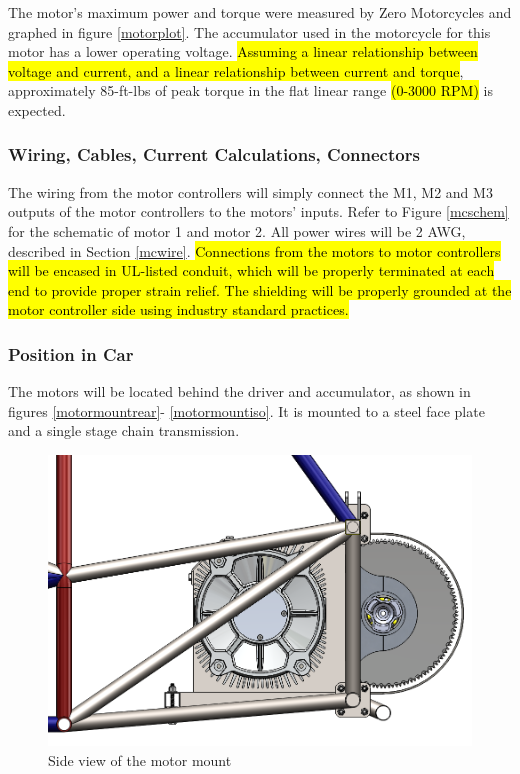 \documentclass{article}
\DeclareRobustCommand{\hlr}[1]{{\sethlcolor{red}\hl{#1}}}
\begin{document}
            The motor's maximum power and torque were measured by Zero Motorcycles and graphed in figure \ref{motorplot}. The accumulator used in the motorcycle for this motor has a lower operating voltage. \hlr{Assuming a linear relationship between voltage and current, and a linear relationship between current and torque}, approximately 85-ft-lbs of peak torque in the flat linear range \hlr{(0-3000 RPM)} is expected.

        \subsubsection{Wiring, Cables, Current Calculations, Connectors} \label{motorswiring}


            The wiring from the motor controllers will simply connect the M1, M2 and M3 outputs of the motor controllers to the motors' inputs. Refer to Figure \ref{mcschem} for the schematic of motor 1 and motor 2. All power wires will be 2 AWG, described in Section \ref{mcwire}.
            \hlr{Connections from the motors to motor controllers will be encased in UL-listed conduit, which will be properly terminated at each end to provide proper strain relief. The shielding will be properly grounded at the motor controller side using industry standard practices.}

        \subsubsection{Position in Car}

            The motors will be located behind the driver and accumulator, as shown in figures \ref{motormountrear}- \ref{motormountiso}. It is mounted to a steel face plate and a single stage chain transmission.

            \begin{figure}[H]
                \centering
                \includegraphics[width = 0.6 \textwidth]{motormount_sideview}
                \caption{Side view of the motor mount}
                \label{motormountside}
            \end{figure}
\end{document}
